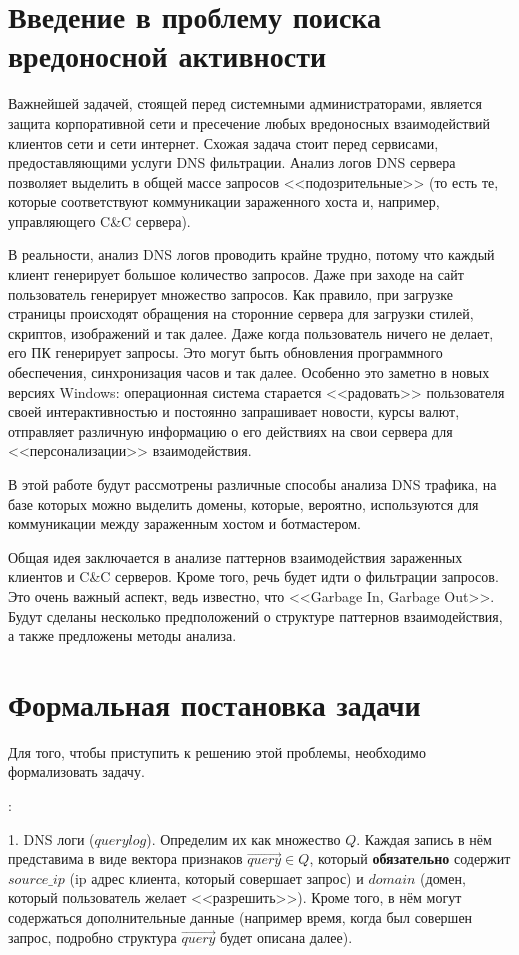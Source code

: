 \documentclass[14pt]{extreport}
\begin{document}
\newpage
    \chapter{Введение в проблему поиска вредоносной активности}

Важнейшей задачей, стоящей перед системными администраторами, является защита корпоративной сети и пресечение любых вредоносных взаимодействий клиентов сети и сети интернет. Схожая задача стоит перед сервисами, предоставляющими услуги DNS фильтрации. Анализ логов DNS сервера позволяет выделить в общей массе запросов <<подозрительные>> (то есть те, которые соответствуют коммуникации зараженного хоста и, например, управляющего C\&C сервера). 

В реальности, анализ DNS логов проводить крайне трудно, потому что каждый клиент генерирует большое количество запросов. Даже при заходе на сайт пользователь генерирует множество запросов. Как правило, при загрузке страницы происходят обращения на сторонние сервера для загрузки стилей, скриптов, изображений и так далее. Даже когда пользователь ничего не делает, его ПК генерирует запросы. Это могут быть обновления программного обеспечения, синхронизация часов и так далее. Особенно это заметно в новых версиях Windows: операционная система старается <<радовать>> пользователя своей интерактивностью и постоянно запрашивает новости, курсы валют, отправляет различную информацию о его действиях на свои сервера для <<персонализации>> взаимодействия.

В этой работе будут рассмотрены различные способы анализа DNS трафика, на базе которых можно выделить домены, которые, вероятно, используются для коммуникации между зараженным хостом и ботмастером.

\newpage
Общая идея заключается в анализе паттернов взаимодействия зараженных клиентов и C\&C серверов. Кроме того, речь будет идти о фильтрации запросов. Это очень важный аспект, ведь известно, что <<Garbage In, Garbage Out>>. Будут сделаны несколько предположений о структуре паттернов взаимодействия, а также предложены методы анализа.

\chapter{Формальная постановка задачи}
	Для того, чтобы приступить к решению этой проблемы, необходимо формализовать задачу.
	
	{:}
		
		1. DNS логи ($querylog$). Определим их как множество $Q$. Каждая запись в нём представима в виде вектора признаков $\vec{query}$$\in$$Q$, который \textbf{обязательно} содержит $source\_ip$ (ip адрес клиента, который совершает запрос) и $domain$ (домен, который пользователь желает <<разрешить>>). Кроме того, в нём могут содержаться дополнительные данные (например время, когда был совершен запрос, подробно структура $\vec{query}$ будет описана далее).
		
\end{document}
